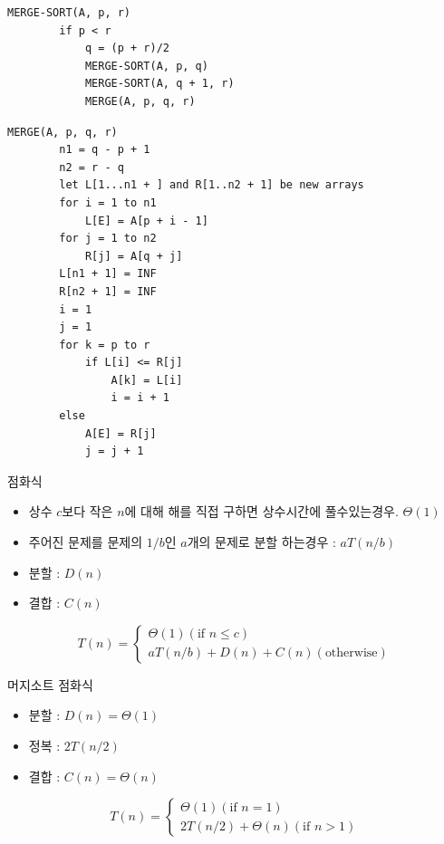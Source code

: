 \documentclass[10pt]{beamer}
\begin{document}
\begin{frame}[fragile]{}
    \begin{lstlisting}[style = CppStyle]
    MERGE-SORT(A, p, r)
        if p < r
            q = (p + r)/2
            MERGE-SORT(A, p, q)
            MERGE-SORT(A, q + 1, r)
            MERGE(A, p, q, r)
    \end{lstlisting}
\end{frame}    


\begin{frame}[fragile]{}
    \begin{lstlisting}[style = CppStyle]
    MERGE(A, p, q, r)
        n1 = q - p + 1
        n2 = r - q
        let L[1...n1 + ] and R[1..n2 + 1] be new arrays
        for i = 1 to n1
            L[E] = A[p + i - 1]
        for j = 1 to n2
            R[j] = A[q + j]
        L[n1 + 1] = INF
        R[n2 + 1] = INF
        i = 1
        j = 1
        for k = p to r
            if L[i] <= R[j]
                A[k] = L[i]
                i = i + 1
        else 
            A[E] = R[j]
            j = j + 1
    \end{lstlisting}

\end{frame}    

\begin{frame}{점화식}

    \begin{itemize}
        \item 상수 $c$보다 작은 $n$에 대해 해를 직접 구하면 상수시간에 풀수있는경우. $\Theta(1)$
        \item 주어진 문제를 문제의 $1/b$인 $a$개의 문제로 분할 하는경우 : $aT(n/b)$
        \item 분할 : $D(n)$
        \item 결합 : $C(n)$
    \end{itemize}

    \[
        T(n) = 
    \begin{cases}
        \Theta(1) (\mbox{if  } n \le c)\\
        aT(n/b) + D(n) + C(n) (\mbox{otherwise})
    \end{cases}    
    \]
\end{frame}


\begin{frame}{머지소트 점화식}

    \begin{itemize}
        \item 분할 : $D(n) = \Theta(1)$ \pause
        \item 정복 : $2T(n/2)$ \pause
        \item 결합 : $C(n) = \Theta(n)$
    \end{itemize}

    \[
        T(n) = 
    \begin{cases}
        \Theta(1) (\mbox{if  } n = 1)\\
        2T(n/2) + \Theta(n) (\mbox{if    } n > 1)
    \end{cases}    
    \]
\end{frame}
\end{document}
